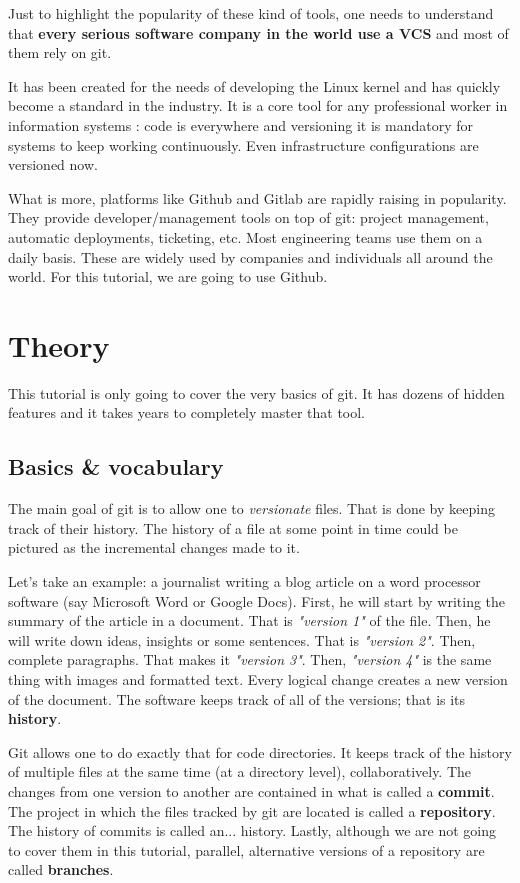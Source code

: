 \documentclass[12pt]{article}
\begin{document}
Just to highlight the popularity of these kind of tools, one needs to understand that \textbf{every serious software company in the world use a VCS} and most of them rely on git.

It has been created for the needs of developing the Linux kernel and has quickly become a standard in the industry. It is a core tool for any professional worker in information systems : code is everywhere and versioning it is mandatory for systems to keep working continuously. Even infrastructure configurations are versioned now.

What is more, platforms like Github and Gitlab are rapidly raising in popularity. They provide developer/management tools on top of git: project management, automatic deployments, ticketing, etc. Most engineering teams use them on a daily basis.
These are widely used by companies and individuals all around the world. For this tutorial, we are going to use Github.%

\section{Theory}

This tutorial is only going to cover the very basics of git. It has dozens of hidden features and it takes years to completely master that tool.

\subsection{Basics \& vocabulary}

The main goal of git is to allow one to \textit{versionate} files. That is done by keeping track of their history. The history of a file at some point in time could be pictured as the incremental changes made to it.

Let's take an example: a journalist writing a blog article on a word processor software (say Microsoft Word or Google Docs). First, he will start by writing the summary of the article in a document. That is \textit{"version 1"} of the file. Then, he will write down ideas, insights or some sentences. That is \textit{"version 2"}. Then, complete paragraphs. That makes it \textit{"version 3"}. Then, \textit{"version 4"} is the same thing with images and formatted text. Every logical change creates a new version of the document. The software keeps track of all of the versions; that is its \textbf{history}.

Git allows one to do exactly that for code directories. It keeps track of the history of multiple files at the same time (at a directory level), collaboratively.
The changes from one version to another are contained in what is called a \textbf{commit}. The project in which the files tracked by git are located is called a \textbf{repository}. The history of commits is called an... history. Lastly, although we are not going to cover them in this tutorial, parallel, alternative versions of a repository are called \textbf{branches}.
\end{document}
